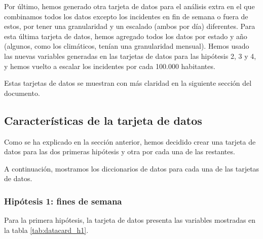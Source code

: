 \documentclass[11pt,a4paper]{article}
\begin{document}
Por último, hemos generado otra tarjeta de datos para el análisis extra en el que combinamos todos los datos excepto los incidentes en fin de semana o fuera de estos, por tener una granularidad y un escalado (ambos por día) diferentes. Para esta última tarjeta de datos, hemos agregado todos los datos por estado y año (algunos, como los climáticos, tenían una granularidad mensual). Hemos usado las nuevas variables generadas en las tarjetas de datos para las hipótesis 2, 3 y 4, y hemos vuelto a escalar los incidentes por cada 100.000 habitantes.

Estas tarjetas de datos se muestran con más claridad en la siguiente sección del documento.

\subsection{Características de la tarjeta de datos}

Como se ha explicado en la sección anterior, hemos decidido crear una tarjeta de datos para las dos primeras hipótesis y otra por cada una de las restantes.

A continuación, mostramos los diccionarios de datos para cada una de las tarjetas de datos.

\subsubsection*{Hipótesis 1: fines de semana}

Para la primera hipótesis, la tarjeta de datos presenta las variables mostradas en la tabla \ref{tab:datacard_h1}.
\end{document}
